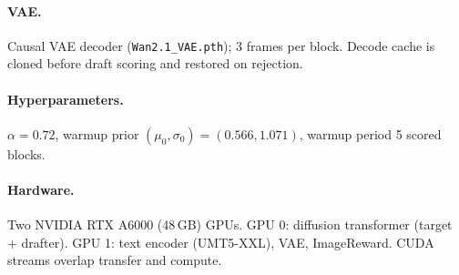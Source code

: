 \documentclass{article}
\begin{document}
\paragraph{VAE.}
Causal VAE decoder (\texttt{Wan2.1\_VAE.pth}); 3 frames per block.
Decode cache is cloned before draft scoring and restored on rejection.

\paragraph{Hyperparameters.}
$\alpha = 0.72$, warmup prior $(\mu_0, \sigma_0) = (0.566, 1.071)$,
warmup period 5 scored blocks.

\paragraph{Hardware.}
Two NVIDIA RTX A6000 (48\,GB) GPUs.
GPU 0: diffusion transformer (target + drafter).
GPU 1: text encoder (UMT5-XXL), VAE, ImageReward.
CUDA streams overlap transfer and compute.
\end{document}
